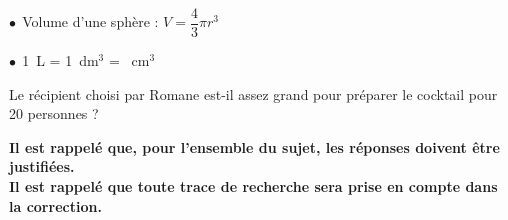 \documentclass[10pt]{article}
\begin{document}
$\bullet~~$Volume d'une sphère : $V = \dfrac{4}{3}\pi r^3$

$\bullet~~$1~L = 1~dm$^3$ = ~cm$^3$

\medskip

Le récipient choisi par Romane est-il assez grand pour préparer le cocktail pour 20
personnes ?

\medskip

\textbf{Il est rappelé que, pour l'ensemble du sujet, les réponses doivent être justifiées.\\
Il est rappelé que toute trace de recherche sera prise en compte dans la
correction.}
\end{document}

